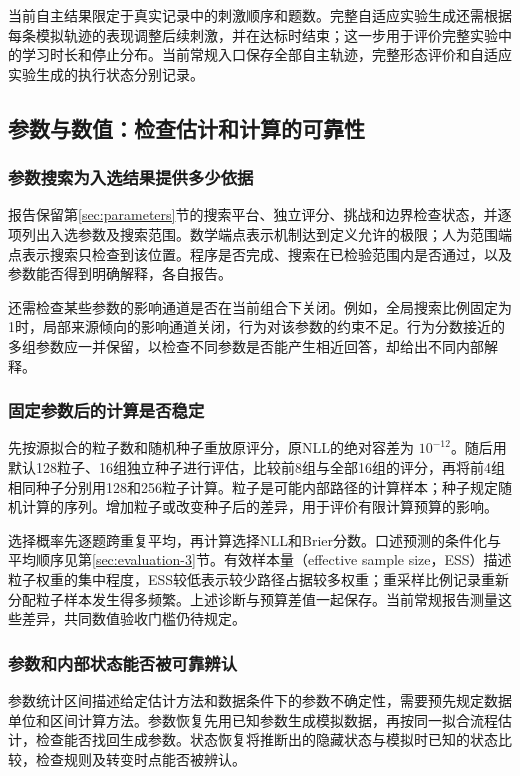 \documentclass[12pt]{article}
\begin{document}
当前自主结果限定于真实记录中的刺激顺序和题数。完整自适应实验生成还需根据每条模拟轨迹的表现调整后续刺激，并在达标时结束；这一步用于评价完整实验中的学习时长和停止分布。当前常规入口保存全部自主轨迹，完整形态评价和自适应实验生成的执行状态分别记录。

\subsection{参数与数值：检查估计和计算的可靠性}
\label{sec:evaluation-6}

\subsubsection{参数搜索为入选结果提供多少依据}

报告保留第\ref{sec:parameters}节的搜索平台、独立评分、挑战和边界检查状态，并逐项列出入选参数及搜索范围。数学端点表示机制达到定义允许的极限；人为范围端点表示搜索只检查到该位置。程序是否完成、搜索在已检验范围内是否通过，以及参数能否得到明确解释，各自报告。

还需检查某些参数的影响通道是否在当前组合下关闭。例如，全局搜索比例固定为1时，局部来源倾向的影响通道关闭，行为对该参数的约束不足。行为分数接近的多组参数应一并保留，以检查不同参数是否能产生相近回答，却给出不同内部解释。

\subsubsection{固定参数后的计算是否稳定}

先按源拟合的粒子数和随机种子重放原评分，原NLL的绝对容差为 $10^{-12}$。随后用默认128粒子、16组独立种子进行评估，比较前8组与全部16组的评分，再将前4组相同种子分别用128和256粒子计算。粒子是可能内部路径的计算样本；种子规定随机计算的序列。增加粒子或改变种子后的差异，用于评价有限计算预算的影响。

选择概率先逐题跨重复平均，再计算选择NLL和Brier分数。口述预测的条件化与平均顺序见第\ref{sec:evaluation-3}节。有效样本量（effective sample size，ESS）描述粒子权重的集中程度，ESS较低表示较少路径占据较多权重；重采样比例记录重新分配粒子样本发生得多频繁。上述诊断与预算差值一起保存。当前常规报告测量这些差异，共同数值验收门槛仍待规定。

\subsubsection{参数和内部状态能否被可靠辨认}

参数统计区间描述给定估计方法和数据条件下的参数不确定性，需要预先规定数据单位和区间计算方法。参数恢复先用已知参数生成模拟数据，再按同一拟合流程估计，检查能否找回生成参数。状态恢复将推断出的隐藏状态与模拟时已知的状态比较，检查规则及转变时点能否被辨认。
\end{document}
